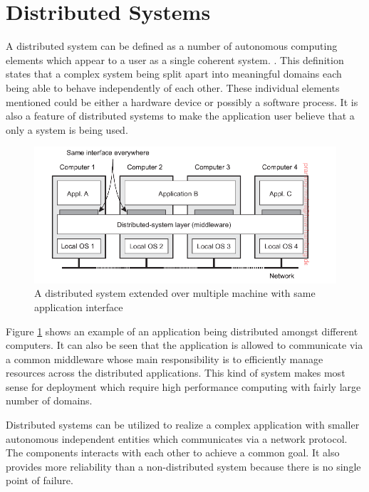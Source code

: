\section{Distributed Systems}

    A distributed system can be defined as a number of autonomous computing elements which 
    appear to a user as a single coherent system. \cite[p.~2]{DistributedSystems}. 
    This definition states that a complex system being split apart into meaningful domains
    each being able to behave independently of each other. These individual elements 
    mentioned could be either a hardware device or possibly a software process. It is also 
    a feature of distributed systems to make the application user believe that a only a system 
    is being used. 

    \begin{figure}[htbp!]
        \centering \includegraphics[scale=0.94]{grafiken/distributedSystem.png}
        \caption{A distributed system extended over multiple machine with same application interface \cite{DistributedSystems}}
        \label{fig:distributedSystem}
    \end{figure}

    \newpage
    \par
        Figure \ref{fig:distributedSystem} shows an example of an application being 
        distributed amongst different computers. It can also be seen that the application
        is allowed to communicate via a common middleware whose main responsibility is to
        efficiently manage resources across the distributed applications. This kind of system
        makes most sense for deployment which require high performance computing with fairly
        large number of domains\footnotemark[\value{footnote}].

    \par
        Distributed systems can be utilized to realize a complex application with smaller
        autonomous independent entities which communicates via a network protocol. The 
        components interacts with each other to achieve a common goal. It also provides
        more reliability than a non-distributed system because there is no single point
        of failure.
        

        